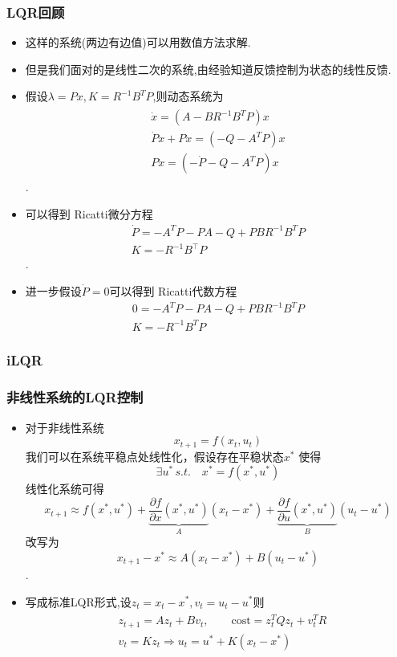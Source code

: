 \documentclass[UTF8, aspectratio=169, 9pt]{ctexbeamer}
\begin{document}
\begin{frame}
  \frametitle{LQR回顾}
  \begin{itemize}
    \item 这样的系统(两边有边值)可以用数值方法求解.
    \item 但是我们面对的是线性二次的系统,由经验知道反馈控制为状态的线性反馈.
    \item 假设$\lambda = Px, K = R^{-1} B^{T} P$,则动态系统为
    \begin{align}
      \begin{split}
      \dot{x}=\left(A-B R^{-1} B^{T} P\right) x \\
      \dot{P} x+P \dot{x}=\left(-Q-A^{T} P\right) x \\
      P \dot{x}=\left(-\dot{P}-Q-A^{T} P\right) x
      \end{split}
    \end{align}.
    \item 可以得到 Ricatti微分方程
    $$
    \begin{array}{l}
    \dot{P}=-A^{T} P-P A-Q+P B R^{-1} B^{T} P \\
    K=-R^{-1} B^{\top} P
    \end{array}
    $$.
    \item 进一步假设$\dot{P}=0$可以得到 Ricatti代数方程
    $$
    \begin{array}{l}
    0=-A^{T} P-P A-Q+P B R^{-1} B^{T} P \\
    K=-R^{-1} B^{T} P
\end{array}
    $$
  \end{itemize}
\end{frame}

\subsubsection{iLQR}
\begin{frame}
\frametitle{非线性系统的LQR控制}
\begin{itemize}
  \item 对于非线性系统
  $$
  x_{t+1} = f(x_t, u_t)
  $$
  我们可以在系统平稳点处线性化，假设存在平稳状态$x^*
$ 使得
$$
  \exists u^* \, s.t.  \quad x^* = f(x^*, u^*)
  $$
  线性化系统可得
  $$
  x_{t+1} \approx f(x^*,u^*) +\underbrace{ \frac{\partial f}{\partial x}(x^*, u^*)}_{A} (x_t - x^*) + \underbrace{ \frac{\partial f}{\partial u }(x^*, u^*)}_{B}(u_t - u^*)
  $$
  改写为
  $$
  x_{t+1} - x^* \approx A(x_t - x^*) + B (u_t - u^*)
  $$.
  \item 写成标准LQR形式,设$z_t = x_t - x^*, v_t = u_t - u^* $则
  \begin{align}
  \begin{split}
     &z_{t+1} =  A z_t + B v_t, \qquad \text{cost}=z^T_t Q z_t + v^T_t R  \\
     &v_t = K z_t \Rightarrow u_t = u^* + K(x_t - x^*)
  \end{split}
  \end{align}
\end{itemize}
\end{frame}
\end{document}
